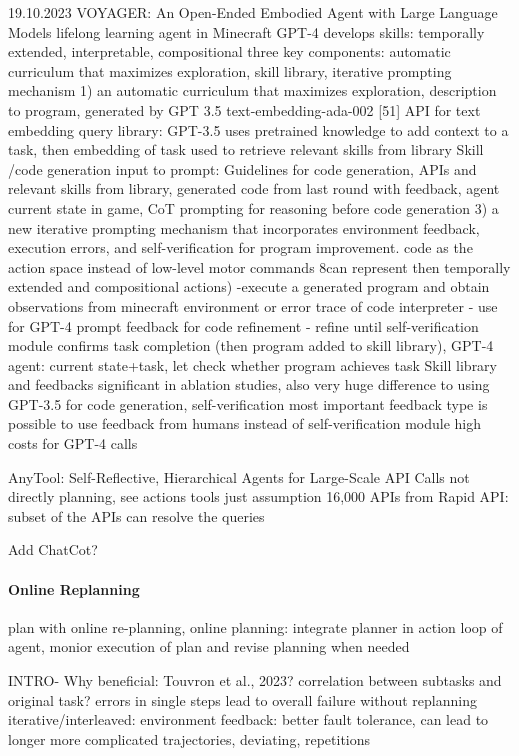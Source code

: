 \documentclass{article}
\begin{document}
\cite{wang_voyager_2023} 19.10.2023 VOYAGER: An Open-Ended Embodied Agent with Large Language Models
lifelong learning agent in Minecraft
GPT-4
develops skills: temporally extended, interpretable, compositional
three key components:  automatic curriculum that maximizes exploration, skill library, iterative prompting mechanism
1) an automatic curriculum that maximizes exploration, 
description to program, generated by GPT 3.5
text-embedding-ada-002 [51] API for text embedding
query library: GPT-3.5 uses pretrained knowledge to add context to a task, then embedding of task used to retrieve relevant skills from library
Skill /code generation input to prompt: Guidelines for code generation, APIs and relevant skills from library, generated code from last round with feedback, agent current state in game, CoT prompting for reasoning before code generation
3) a new iterative prompting mechanism that incorporates environment feedback, execution errors, and self-verification for program improvement.
code as the action space instead of low-level motor commands 8can represent then temporally extended and compositional actions)
-execute a generated program  and obtain observations from minecraft environment or error trace of code interpreter
- use for GPT-4 prompt feedback for code refinement
- refine until self-verification module confirms task completion (then program added to skill library), GPT-4 agent: current state+task, let check whether program achieves task
Skill library and feedbacks significant in ablation studies, also very huge difference to using GPT-3.5 for code generation, self-verification most important feedback type
is possible to use feedback from humans instead of self-verification module
high costs for GPT-4 calls

\cite{du_anytool_2024} AnyTool: Self-Reflective, Hierarchical Agents for Large-Scale API Calls
not directly planning, see actions tools
just assumption
16,000 APIs from Rapid API: subset of the APIs can resolve the queries

Add ChatCot? \cite{chen_chatcot_2023}

\paragraph{Online Replanning}
plan with online re-planning,
online planning: integrate planner in action loop of agent, monior execution of plan and revise planning when needed

INTRO- Why beneficial:
Touvron et al., 2023? correlation between subtasks and original task?
errors in single steps lead to overall failure without replanning
iterative/interleaved: environment feedback: better fault tolerance, can lead to longer more complicated trajectories, deviating, repetitions
\end{document}
